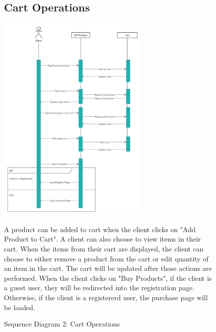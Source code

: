 \documentclass[11pt]{article}
\newcounter{use case ID}
\begin{document}
\begin{figure}[ht!]
    \subsection{Cart Operations}
    \centering
    \includegraphics[width=0.65\textwidth,height=0.45\paperheight]{Diagrams/Sequence/Cart_Operations.jpg} 
    \caption{Sequence Diagram 2: Cart Operations}
    \label{fig: Cart Operations}
    \begin{flushleft}
        A product can be added to cart when the client clicks on "Add Product to Cart". A client can also choose to view items in their cart. When the items from their cart are displayed, the client can choose to either remove a product from the cart or edit quantity of an item in the cart. The cart will be updated after those actions are performed. When the client clicks on "Buy Products", if the client is a guest user, they will be redirected into the registration page. Otherwise, if the client is a registererd user, the purchase page will be loaded. 
    \end{flushleft}
\end{figure}
\end{document}
